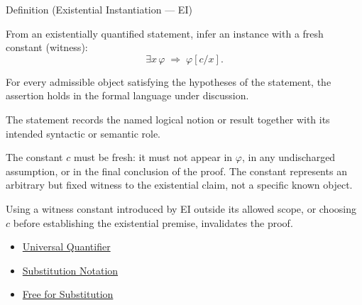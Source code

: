 \begin{definitionbox}{Definition (Existential Instantiation --- EI)}
\begin{definition}\label{def:ei}
From an existentially quantified statement, infer an instance with a fresh
constant (witness):
\[
\exists x\,\varphi \;\Rightarrow\; \varphi[c/x].
\]
\end{definition}
\end{definitionbox}
\begin{remark*}
For every admissible object satisfying the hypotheses of the statement, the
assertion holds in the formal language under discussion.
\end{remark*}

\begin{remark*}[Interpretation]
The statement records the named logical notion or result together with its
intended syntactic or semantic role.
\end{remark*}


\begin{remark*}[Exposition]
The constant $c$ must be fresh: it must not appear in $\varphi$, in any
undischarged assumption, or in the final conclusion of the proof. The constant
represents an arbitrary but fixed witness to the existential claim, not a
specific known object.
\end{remark*}

\begin{remark*}[Exposition]
Using a witness constant introduced by EI outside its allowed scope, or
choosing $c$ before establishing the existential premise, invalidates the proof.
\end{remark*}


\begin{dependencies}
\begin{itemize}
  \item \hyperref[def:universal-q]{Universal Quantifier}
  \item \hyperref[def:subst-notation]{Substitution Notation}
  \item \hyperref[def:free-for]{Free for Substitution}
\end{itemize}
\end{dependencies}

